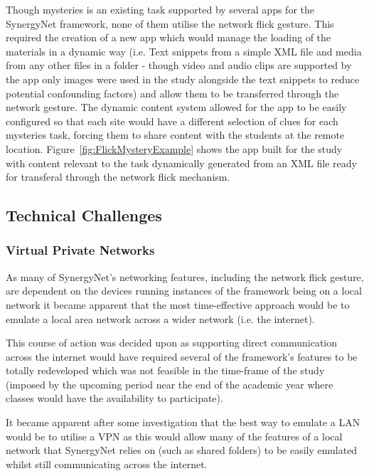 \documentclass[a4paper,11pt]{article}
\begin{document}
Though mysteries is an existing task supported by several apps for the SynergyNet framework, none of them utilise the network flick gesture.
This required the creation of a new app which would manage the loading of the materials in a dynamic way (i.e. Text snippets from a simple XML file and media from any other files in a folder - though video and audio clips are supported by the app only images were used in the study alongside the text snippets to reduce potential confounding factors) and allow them to be transferred through the network gesture.
The dynamic content system allowed for the app to be easily configured so that each site would have a different selection of clues for each mysteries task, forcing them to share content with the students at the remote location.
Figure~\ref{fig:FlickMysteryExample} shows the app built for the study with content relevant to the task dynamically generated from an XML file ready for transferal through the network flick mechanism.

\subsection{Technical Challenges}


\subsubsection{Virtual Private Networks}

As many of SynergyNet’s networking features, including the network flick gesture, are dependent on the devices running instances of the framework being on a local network it became apparent that the most time-effective approach would be to emulate a local area network across a wider network (i.e. the internet).

This course of action was decided upon as supporting direct communication across the internet would have required several of the framework’s features to be totally redeveloped which was not feasible in the time-frame of the study (imposed by the upcoming period near the end of the academic year where classes would have the availability to participate).

It became apparent after some investigation that the best way to emulate a LAN would be to utilise a VPN as this would allow many of the features of a local network that SynergyNet relies on (such as shared folders) to be easily emulated whilst still communicating across the internet.
\end{document}
